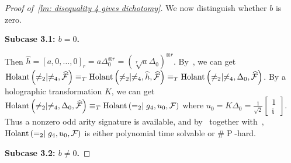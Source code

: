 \begin{proof}[Proof of~\cref{lm: disequality 4 gives dichotomy}]
    We now distinguish whether $b$ is zero.
    
    \textbf{Subcase 3.1: $b=0$.}

    Then $\widehat{h}=[a,0,\dots,0]_r=a\Delta_0^{\otimes r}=(\sqrt[r]a \Delta_0)^{\otimes r}$. By~, we can get $\operatorname{Holant}\left(\neq_2\mid \neq_4,\widehat{\mathcal{F}}\right)\equiv_T \operatorname{Holant}\left(\neq_2\mid \neq_4,\widehat{h},\widehat{\mathcal{F}}\right)\equiv_T \operatorname{Holant}\left(\neq_2\mid \neq_4,\Delta_0,\widehat{\mathcal{F}}\right)$. By a holographic transformation $K$, we can get $\operatorname{Holant}\left(\neq_2\mid \neq_4,\Delta_0,\widehat{\mathcal{F}}\right)\equiv_T \operatorname{Holant}\left(=_2\mid g_4,u_0,\mathcal{F}\right)$ where $u_0=K\Delta_0=\frac{1}{\sqrt{2}}\begin{bmatrix}1\\ \mathfrak i\end{bmatrix}.$ Thus a nonzero odd arity signature is available, and by~ together with~\cite{GSS26}, $\operatorname{Holant}\left(=_2\mid g_4,u_0,\mathcal{F}\right)$ is either polynomial time solvable or $\#\operatorname{P}$-hard.

    \textbf{Subcase 3.2: $b\neq 0$.}


\end{proof}
